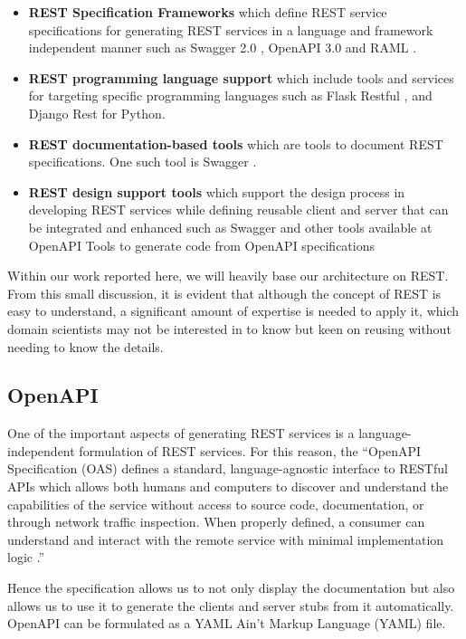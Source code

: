 \begin{itemize}
\item \textbf{REST Specification Frameworks} which  define
  REST service specifications for generating REST services in a
  language and framework independent manner such as Swagger 2.0
  \cite{openapi-2}, OpenAPI 3.0 \cite{openapi-3} and RAML
  \cite{raml-1}.
\item \textbf{REST programming language support} which include tools and services
  for targeting specific programming languages such as Flask Restful
  \cite{www-flask-restful}, and Django Rest \cite{www-django-rest} for Python.
\item \textbf{REST documentation-based tools} which are tools to document
  REST specifications. One such tool is Swagger \cite{www-swagger}.
\item \textbf{REST design support tools} which support the
  design process in developing REST services while defining reusable client and server that can be integrated and enhanced such as Swagger \cite{www-swagger} and other tools
  available at OpenAPI Tools \cite{www-openapi-tools} to generate code
  from OpenAPI specifications \cite{www-swagger-codegen}
\end{itemize}

Within our work reported here, we will heavily base our architecture on REST. From this small discussion, it is evident that although the concept of REST is easy to understand, a significant amount of expertise is needed to apply it, which domain scientists may not be interested in to know but keen on reusing without needing to know the details.

\subsection{OpenAPI}

One of the important aspects of generating REST services is a language-independent formulation of REST services. For this reason, the ``OpenAPI Specification (OAS) defines a standard, language-agnostic interface to RESTful APIs which allows both humans and computers to discover and understand the capabilities of the service without access to source code, documentation, or through network traffic inspection. When properly defined, a consumer can understand and interact with the remote service with minimal implementation logic \cite{openapi}.''

Hence the specification allows us to not only display the documentation but also allows us to use it to generate the clients and server stubs from it automatically. OpenAPI can be formulated as a YAML Ain't Markup Language (YAML) \cite{www-yaml} file. 

